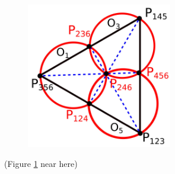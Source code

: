 \documentclass[suppldata, dvipdfmx]{interact}
\theoremstyle{plain}%
\theoremstyle{definition}
\theoremstyle{remark}
\theoremstyle{problemstyle}
\begin{document}
\begin{figure}[h!tbp]
  \centering
  \includegraphics[width=2.5in,
  keepaspectratio]{./img/sphairahedron/cube/extendedSchottky.jpg}
 \caption{}
 \label{fig:extendedSchottky}
\end{figure}
\noindent(Figure \ref{fig:extendedSchottky} near here)
\end{document}
